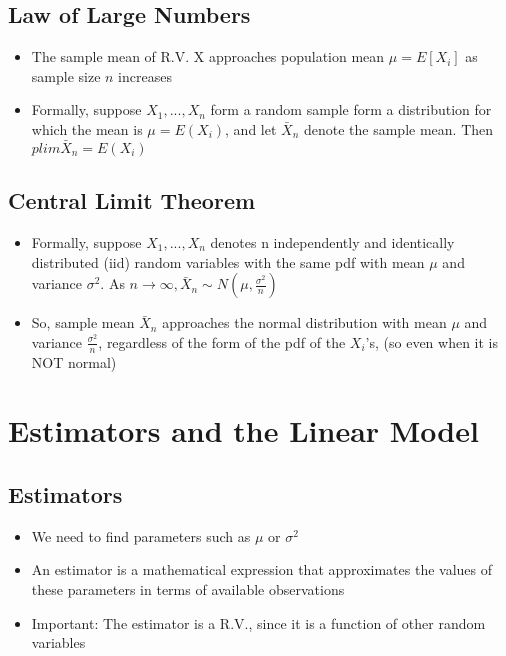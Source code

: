 \documentclass[10pt, oneside]{article}
\begin{document}
\subsection{Law of Large Numbers}
\begin{itemize}
    \item The sample mean of R.V. X approaches population mean $\mu = E[X_i]$ as sample size $n$ increases
    \item Formally, suppose $X_1, ..., X_n$ form a random sample form a distribution for which the mean is $\mu =E(X_i)$, and let $\bar X_n $ denote the sample mean. Then $plim \bar X_n = E(X_i)$
\end{itemize}

\subsection{Central Limit Theorem}
\begin{itemize}
    \item Formally, suppose $X_1, ..., X_n$ denotes n independently and identically distributed (iid) random variables with the same pdf with mean $\mu$ and variance $\sigma^2$. As $n\rightarrow \infty, \bar X_n \sim N(\mu, \frac{\sigma^2}{n})$
    \item So, sample mean $\bar X_n $ approaches the normal distribution with mean $\mu$ and variance $\frac{\sigma^2}{n}$, regardless of the form of the pdf of the $X_i$'s, (so even when it is NOT normal)
\end{itemize}

\section{Estimators and the Linear Model}

\subsection{Estimators}
\begin{itemize}
    \item We need to find parameters such as $\mu$ or $\sigma^2$
    \item An estimator is a mathematical expression that approximates the values of these parameters in terms of available observations
    \item Important: The estimator is a R.V., since it is a function of other random variables
\end{itemize}
\end{document}
